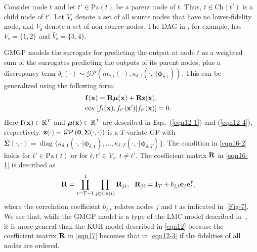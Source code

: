 \documentclass[journal ]{new-aiaa}
\DeclareMathOperator{\diag}{diag}
\begin{document}
	Consider node $t$ and let $t' \in \text{Pa}(t)$ be a parent node of $t$.
	Thus, $t \in \text{Ch}(t')$ is a child node of $t'$.
	Let $V_\text{s}$ denote a set of all source nodes that have no lower-fidelity node, and $\bar{V}_\text{s}$ denote a set of non-source nodes.
	The DAG in , for example, has $V_\text{s}=\{1,2\}$ and $\bar{V}_\text{s}=\{3,4\}$.
	
	GMGP models the surrogate for predicting the output at node $t$ as a weighted sum of the surrogates predicting the outputs of its parent nodes, plus a discrepancy term $\delta_t(\cdot)\sim \mathcal{GP}\left(m_{\delta,t}(\cdot),\kappa_{\delta,t}(\cdot,\cdot|{\boldsymbol \phi}_{\delta,t})\right)$.
	This can be generalized using the following form:
	\begin{subequations}\label{eqn16}
		\begin{align}
			&{\bf f}({\bf x}) =  {\bf R} {\boldsymbol \mu}({\bf x}) + {\bf R} {\bf z}({\bf x}) \label{eqn16-1},\\
			&\text{cov}\left[f_{t}({\bf x}),f_{t'}({\bf x}')|f_{t'}({\bf x})\right]=0 \label{eqn16-2}.
		\end{align}	
	\end{subequations}
	Here ${\bf f}({\bf x}) \in \mathbb{R}^T$ and ${\boldsymbol \mu}({\bf x}) \in \mathbb{R}^T$ are described in Eqs.~(\ref{eqn12-1}) and (\ref{eqn12-4}), respectively.
	${\bf z}(\cdot) \sim \mathcal{GP}\left({\bf 0},{\boldsymbol \Sigma}(\cdot,\cdot)\right)$ is a $T$-variate GP with ${\boldsymbol \Sigma}(\cdot,\cdot) = \diag\{\kappa_{\delta,1}(\cdot,\cdot|{\boldsymbol \phi}_{\delta,1}),\dots,\kappa_{\delta,T}(\cdot,\cdot|{\boldsymbol \phi}_{\delta,T})\}$.
	The condition in \cref{eqn16-2} holds for $t' \in  \text{Pa}(t)$ or for $t,t' \in  V_\text{s}, \, t \neq t'$.
	The coefficient matrix ${\bf R}$ in \cref{eqn16-1} is described as
	\begin{equation}\label{eqn17}
		{\bf R} = \prod_{t=T-1}^1 \prod_{j \in \text{Ch}(t)} {\bf R}_{jt}, \ \ {\bf R}_{jt} = {\bf I}_T + b_{j,t} {\bf e}_j {\bf e}^\intercal_{t},
	\end{equation}
	where the correlation coefficient $b_{j,t}$ relates nodes $j$ and $t$ as indicated in~\cref{Fig-7}.
	We see that, while the GMGP model is a type of the LMC model described in~, it is more general than the KOH model described in \cref{eqn12} because the coefficient matrix ${\bf R}$ in \cref{eqn17} becomes that in \cref{eqn12-3} if the fidelities of all nodes are ordered.
	
\end{document}

